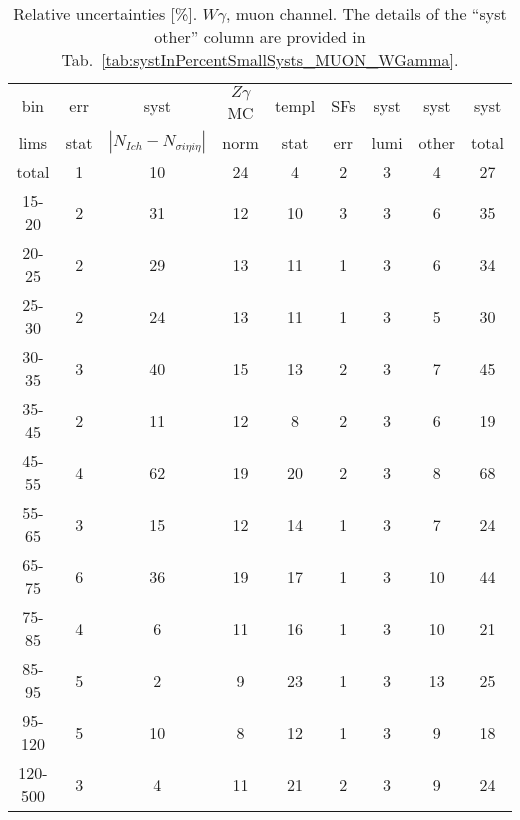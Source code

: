 \begin{table}[h]
  \scriptsize
  \begin{center}
  \caption{Relative uncertainties [\%]. $W\gamma$, muon channel. The details of the ``syst other'' column are provided in Tab.~\ref{tab:systInPercentSmallSysts_MUON_WGamma}. }
   \begin{tabular}{|c|c|c|c|c|c|c|c|c|}
    bin  & err & syst & $Z\gamma$ MC & templ & SFs & syst & syst & syst\\
    lims  & stat & $|N_{Ich}-N_{\sigma{i\eta i\eta}}|$ & norm & stat & err & lumi & other & total\\ \hline
    total  & 1 & 10 & 24 & 4 & 2 & 3 & 4 & 27 \\ \hline
    15-20 & 2 & 31 & 12 & 10 & 3 & 3 & 6 & 35 \\ \hline
    20-25 & 2 & 29 & 13 & 11 & 1 & 3 & 6 & 34 \\ \hline
    25-30 & 2 & 24 & 13 & 11 & 1 & 3 & 5 & 30 \\ \hline
    30-35 & 3 & 40 & 15 & 13 & 2 & 3 & 7 & 45 \\ \hline
    35-45 & 2 & 11 & 12 & 8 & 2 & 3 & 6 & 19 \\ \hline
    45-55 & 4 & 62 & 19 & 20 & 2 & 3 & 8 & 68 \\ \hline
    55-65 & 3 & 15 & 12 & 14 & 1 & 3 & 7 & 24 \\ \hline
    65-75 & 6 & 36 & 19 & 17 & 1 & 3 & 10 & 44 \\ \hline
    75-85 & 4 & 6 & 11 & 16 & 1 & 3 & 10 & 21 \\ \hline
    85-95 & 5 & 2 & 9 & 23 & 1 & 3 & 13 & 25 \\ \hline
    95-120 & 5 & 10 & 8 & 12 & 1 & 3 & 9 & 18 \\ \hline
    120-500 & 3 & 4 & 11 & 21 & 2 & 3 & 9 & 24 \\ \hline
  \end{tabular}
  \label{tab:systInPercent_MUON_WGamma}
  \end{center}
\end{table}



